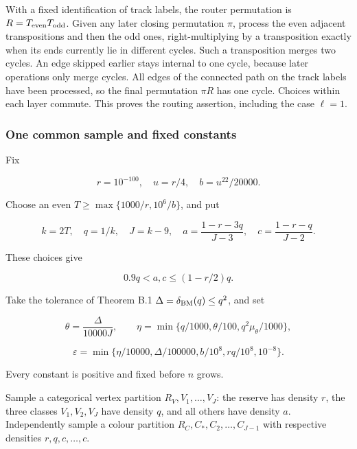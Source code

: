 \documentclass[11pt,a4paper]{article}
\begin{document}
With a fixed identification of track labels, the router permutation is \(R=T_{\rm even}T_{\rm odd}\). Given any later closing permutation \(\pi\), process the even adjacent transpositions and then the odd ones, right-multiplying by a transposition exactly when its ends currently lie in different cycles. Such a transposition merges two cycles. An edge skipped earlier stays internal to one cycle, because later operations only merge cycles. All edges of the connected path on the track labels have been processed, so the final permutation \(\pi R\) has one cycle. Choices within each layer commute. This proves the routing assertion, including the case \(\ell=1\).

\hypertarget{one-common-sample-and-fixed-constants}{%
\subsubsection{One common sample and fixed constants}\label{one-common-sample-and-fixed-constants}}

Fix

\[
r=10^{-100},\quad u=r/4,\quad b=u^{22}/20000.
\]

Choose an even \(T\ge\max\{1000/r,10^6/b\}\), and put

\[
k=2T,\quad q=1/k,\quad J=k-9,
\quad a=\frac{1-r-3q}{J-3},
\quad c=\frac{1-r-q}{J-2}.
\]

These choices give

\begin{equation}
0.9q<a,c\le(1-r/2)q.
\tag{PF4}\label{eq:PF4}
\end{equation}

Take the tolerance of Theorem B.1 \(\Delta=\delta_{\rm BM}(q)\le q^2\), and set

\[
\theta=\frac{\Delta}{10000J},\qquad
\eta=\min\{q/1000,\theta/100,q^2\mu_\theta/1000\},
\]

\begin{equation}
\varepsilon=\min\{\eta/10000,\Delta/100000,
b/10^8,rq/10^8,10^{-8}\}.
\tag{PF5}\label{eq:PF5}
\end{equation}

Every constant is positive and fixed before \(n\) grows.

Sample a categorical vertex partition \(R_V,V_1,\ldots,V_J\): the reserve has density \(r\), the three classes \(V_1,V_2,V_J\) have density \(q\), and all others have density \(a\). Independently sample a colour partition \(R_C,C_*,C_2,\ldots,C_{J-1}\) with respective densities \(r,q,c,\ldots,c\).
\end{document}
